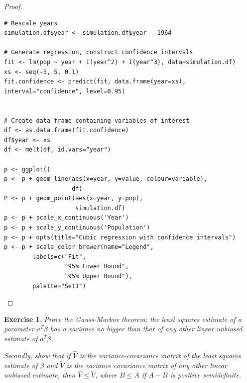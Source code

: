 \documentclass[12pt]{amsart}
\theoremstyle{plain}%
\newtheorem{exer}[thm]{Exercise}
\theoremstyle{definition}
\theoremstyle{remark}
\begin{document}
\begin{proof}
\begin{lstlisting}
# Rescale years
simulation.df$year <- simulation.df$year - 1964

# Generate regression, construct confidence intervals
fit <- lm(pop ~ year + I(year^2) + I(year^3), data=simulation.df)
xs <- seq(-5, 5, 0.1)
fit.confidence <- predict(fit, data.frame(year=xs), interval="confidence", level=0.95)


# Create data frame containing variables of interest
df <- as.data.frame(fit.confidence)
df$year <- xs
df <- melt(df, id.vars="year")

p <- ggplot()
p <- p + geom_line(aes(x=year, y=value, colour=variable),
                   df)
P <- p + geom_point(aes(x=year, y=pop), 
                    simulation.df)
p <- p + scale_x_continuous('Year') 
p <- p + scale_y_continuous('Population')
p <- p + opts(title="Cubic regression with confidence intervals")
p <- p + scale_color_brewer(name="Legend",
        labels=c("Fit", 
                 "95% Lower Bound", 
                 "95% Upper Bound"), 
        palette="Set1")
\end{lstlisting}

\end{proof}
\begin{exer}
    Prove the Gauss-Markov theorem: the least squares estimate of a parameter $a^T\beta$ has a variance no bigger than that of any other linear unbiased estimate of $a^T\beta$.

    Secondly, show that if $\hat V$ is the variance-covariance matrix of the least squares estimate of $\beta$ and $\tilde V$ is the variance covariance matrix of any other linear unbiased estimate, then $\hat V \leq \tilde V$, where $B \leq A$ if $A - B$ is positive semidefinite.
\end{exer}
\end{document}

